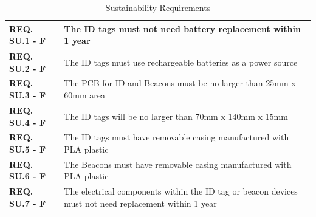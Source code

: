 \bgroup
\def\arraystretch{1.5}
\begin{table}[H]
\centering
\begin{tabular}{ | m{3cm} | m{13cm}| } 
\hline
\textbf{REQ. SU.1 - F} & The ID tags must not need battery replacement within 1 year \\
\hline
\textbf{REQ. SU.2 - F} & The ID tags must use rechargeable batteries as a power source \\
\hline
\textbf{REQ. SU.3 - F} & The PCB for ID and Beacons must be no larger than 25mm x 60mm area \\
\hline
\textbf{REQ. SU.4 - F} & The ID tags will be no larger than 70mm x 140mm x 15mm \\
\hline
\textbf{REQ. SU.5 - F} & The ID tags must have removable casing manufactured with PLA plastic \\
\hline
\textbf{REQ. SU.6 - F} & The Beacons must have removable casing manufactured with PLA plastic \\
\hline
\textbf{REQ. SU.7 - F} & The electrical components within the ID tag or beacon devices must not need replacement within 1 year \\ 
\hline
\end{tabular}
\caption{Sustainability Requirements}
\end{table}	


%